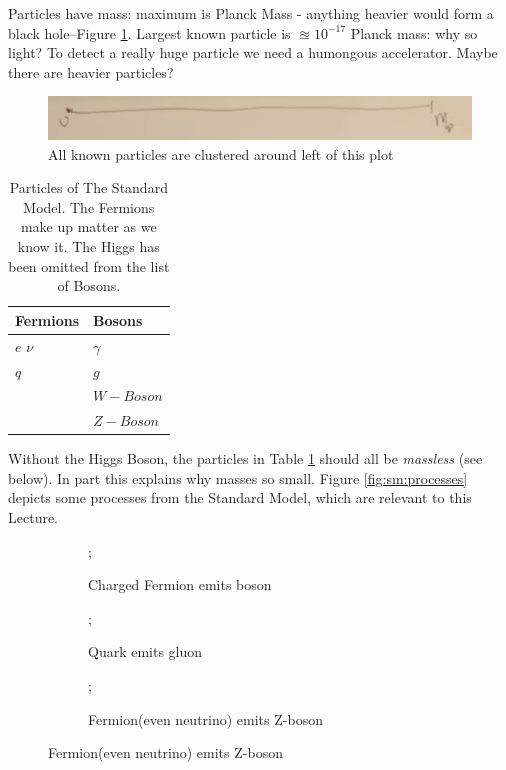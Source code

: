 \documentclass[]{article}
\begin{document}
Particles have mass: maximum is Planck Mass - anything heavier would form a black hole--Figure \ref{fig:higgs-masses}. Largest known particle is $\approxeq 10^{-17}$ Planck mass: why so light? To detect a really huge particle we need a humongous accelerator. Maybe there are heavier particles?

\begin{figure}[H]
	\caption{All known particles are clustered around left of this plot}\label{fig:higgs-masses}
	\includegraphics[width=0.6\textheight]{higgs-masses}
\end{figure}

\begin{table}[H]
	\begin{center}
		\caption[Particles of The Standard Model]{Particles of The Standard Model. The Fermions make up matter as we know it. The Higgs has been omitted from the list of Bosons.}\label{table:standard-model}
		\begin{tabular}{|l|l|} \hline
			Fermions & Bosons\\ \hline
			$e$ $\nu$&$\gamma$\\
			$q$&$g$\\
			&$W-Boson$\\
			&$Z-Boson$\\ \hline
		\end{tabular}
	\end{center}
\end{table}

Without the Higgs Boson, the particles in Table \ref{table:standard-model} should all be \emph{massless} (see below). In part this explains why masses so small. Figure \ref{fig:sm:processes} depicts some processes from the Standard Model, which are relevant to this Lecture.



\begin{figure}[H]
	\caption{Processes of the Standard Model (not exhaustive)}\label{fig:sm:processes}
	\begin{subfigure}[t]{0.3\textwidth}
		\caption{Charged Fermion emits boson}
		;
	\end{subfigure}
	\begin{subfigure}[t]{0.3\textwidth}
		\caption{Quark emits gluon}
		;
	\end{subfigure}
	\begin{subfigure}[t]{0.3\textwidth}
		\caption{Fermion(even neutrino) emits Z-boson}
		;
	\end{subfigure}
\end{figure} 
\end{document}
